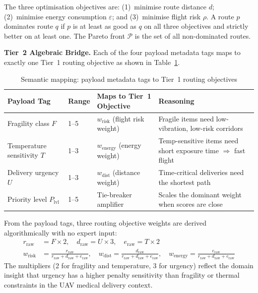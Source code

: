 \documentclass{ssnreview}
\begin{document}
The three optimisation objectives are: (1)~minimise route distance $d$; (2)~minimise
energy consumption $\varepsilon$; and (3)~minimise flight risk $\rho$. A route $p$
dominates route $q$ if $p$ is at least as good as $q$ on all three objectives and
strictly better on at least one. The Pareto front $\mathcal{P}$ is the set of all
non-dominated routes.

\textbf{Tier~2 Algebraic Bridge.} Each of the four payload metadata tags maps to exactly
one Tier~1 routing objective as shown in Table~\ref{tab:semantic-mapping}.

\begin{table}[H]
\centering\caption{Semantic mapping: payload metadata tags to Tier~1 routing objectives}\label{tab:semantic-mapping}\small
\begin{tabularx}{\textwidth}{p{2.8cm} p{1.4cm} X p{4.2cm}}
\toprule
\textbf{Payload Tag} & \textbf{Range} & \textbf{Maps to Tier~1 Objective} & \textbf{Reasoning}\\
\midrule
Fragility class $F$      & 1--5 & $w_\mathrm{risk}$ (flight risk weight)   & Fragile items need low-vibration, low-risk corridors\\
Temperature sensitivity $T$ & 1--3 & $w_\mathrm{energy}$ (energy weight)  & Temp-sensitive items need short exposure time $\Rightarrow$ fast flight\\
Delivery urgency $U$     & 1--3 & $w_\mathrm{dist}$ (distance weight)       & Time-critical deliveries need the shortest path\\
Priority level $P_\mathrm{lvl}$ & 1--5 & Tie-breaker amplifier           & Scales the dominant weight when scores are close\\
\bottomrule
\end{tabularx}
\end{table}

From the payload tags, three routing objective weights are derived algorithmically with
no expert input:
\begin{align}
  r_\mathrm{raw} &= F \times 2, \quad d_\mathrm{raw} = U \times 3, \quad e_\mathrm{raw} = T \times 2 \label{eq:raw}\\
  w_\mathrm{risk} &= \frac{r_\mathrm{raw}}{r_\mathrm{raw} + d_\mathrm{raw} + e_\mathrm{raw}}, \quad
  w_\mathrm{dist} = \frac{d_\mathrm{raw}}{r_\mathrm{raw} + d_\mathrm{raw} + e_\mathrm{raw}}, \quad
  w_\mathrm{energy} = \frac{e_\mathrm{raw}}{r_\mathrm{raw} + d_\mathrm{raw} + e_\mathrm{raw}} \label{eq:weights}
\end{align}
The multipliers (2 for fragility and temperature, 3 for urgency) reflect the domain
insight that urgency has a higher penalty sensitivity than fragility or thermal
constraints in the UAV medical delivery context.
\end{document}
